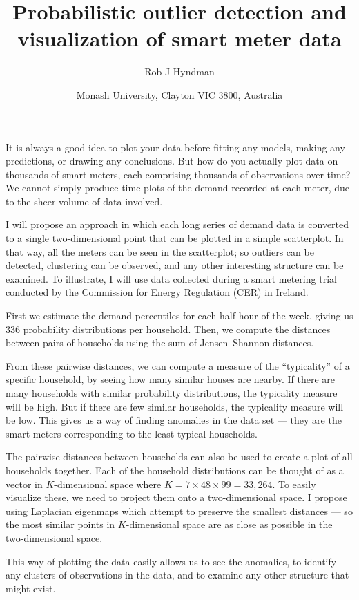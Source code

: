 \documentclass[11pt,]{article}
\title{Probabilistic outlier detection and visualization of smart meter data}
\author{Rob J Hyndman}
\date{Monash University, Clayton VIC 3800, Australia}
\begin{document}
\maketitle

It is always a good idea to plot your data before fitting any models,
making any predictions, or drawing any conclusions. But how do you
actually plot data on thousands of smart meters, each comprising
thousands of observations over time? We cannot simply produce time plots
of the demand recorded at each meter, due to the sheer volume of data
involved.

I will propose an approach in which each long series of demand data is
converted to a single two-dimensional point that can be plotted in a
simple scatterplot. In that way, all the meters can be seen in the
scatterplot; so outliers can be detected, clustering can be observed,
and any other interesting structure can be examined. To illustrate, I
will use data collected during a smart metering trial conducted by the
Commission for Energy Regulation (CER) in Ireland.

First we estimate the demand percentiles for each half hour of the week,
giving us 336 probability distributions per household. Then, we compute
the distances between pairs of households using the sum of
Jensen--Shannon distances.

From these pairwise distances, we can compute a measure of the
``typicality'' of a specific household, by seeing how many similar
houses are nearby. If there are many households with similar probability
distributions, the typicality measure will be high. But if there are few
similar households, the typicality measure will be low. This gives us a
way of finding anomalies in the data set --- they are the smart meters
corresponding to the least typical households.

The pairwise distances between households can also be used to create a
plot of all households together. Each of the household distributions can
be thought of as a vector in \(K\)-dimensional space where
\(K=7\times48\times99 = 33,264\). To easily visualize these, we need to
project them onto a two-dimensional space. I propose using Laplacian
eigenmaps which attempt to preserve the smallest distances --- so the
most similar points in \(K\)-dimensional space are as close as possible
in the two-dimensional space.

This way of plotting the data easily allows us to see the anomalies, to
identify any clusters of observations in the data, and to examine any
other structure that might exist.
\end{document}

